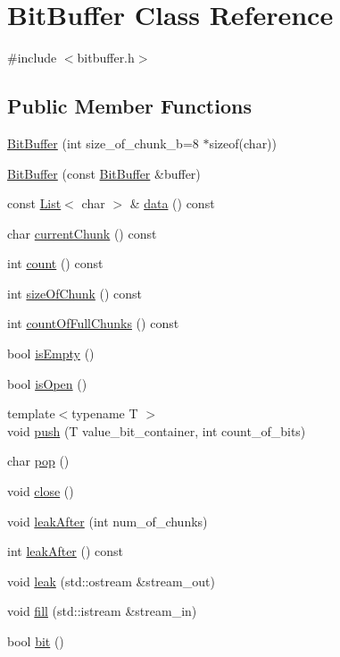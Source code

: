 \hypertarget{class_bit_buffer}{}\section{Bit\+Buffer Class Reference}
\label{class_bit_buffer}


{\ttfamily \#include $<$bitbuffer.\+h$>$}

\subsection*{Public Member Functions}
\begin{DoxyCompactItemize}
\item 
\hyperlink{class_bit_buffer_a01ccbe0835f8aaa203720d6c4f99b68e}{Bit\+Buffer} (int size\+\_\+of\+\_\+chunk\+\_\+b=8 $\ast$sizeof(char))
\item 
\hyperlink{class_bit_buffer_af78925f3b1d992d934545616c1d00dd2}{Bit\+Buffer} (const \hyperlink{class_bit_buffer}{Bit\+Buffer} \&buffer)
\item 
const \hyperlink{class_list}{List}$<$ char $>$ \& \hyperlink{class_bit_buffer_ad56372e6eb410a195913a0cae28d7006}{data} () const
\item 
char \hyperlink{class_bit_buffer_a3f5383b7d9b27478f614cd8762a266a5}{current\+Chunk} () const
\item 
int \hyperlink{class_bit_buffer_a8c13b651d37586ec5c2d30f45ed89e53}{count} () const
\item 
int \hyperlink{class_bit_buffer_adf758958884467e15cd018190178bf3d}{size\+Of\+Chunk} () const
\item 
int \hyperlink{class_bit_buffer_ad473b6b2aedbb96198d57d5762c5c108}{count\+Of\+Full\+Chunks} () const
\item 
bool \hyperlink{class_bit_buffer_aaec114c48d1b1be84a8178b6b956f3d0}{is\+Empty} ()
\item 
bool \hyperlink{class_bit_buffer_ae70825daafd0a00625fbb6dfb9b83fba}{is\+Open} ()
\item 
{\footnotesize template$<$typename T $>$ }\\void \hyperlink{class_bit_buffer_a1998d0bdd95e025f39e81671f5a20106}{push} (T value\+\_\+bit\+\_\+container, int count\+\_\+of\+\_\+bits)
\item 
char \hyperlink{class_bit_buffer_a8f569dfa9535ac107c84846f22a45221}{pop} ()
\item 
void \hyperlink{class_bit_buffer_a1075aee0daeee83dbe4908c325b6969f}{close} ()
\item 
void \hyperlink{class_bit_buffer_a10df48560dfbdd304a4e05a610379dc8}{leak\+After} (int num\+\_\+of\+\_\+chunks)
\item 
int \hyperlink{class_bit_buffer_a28c31e06cd23a8ab3f7276bbb2c64b39}{leak\+After} () const
\item 
void \hyperlink{class_bit_buffer_a56d1e27a00a27e1ac95f2e03255081eb}{leak} (std\+::ostream \&stream\+\_\+out)
\item 
void \hyperlink{class_bit_buffer_a91b2bfeb34d3e2d01fd23f417928f261}{fill} (std\+::istream \&stream\+\_\+in)
\item 
bool \hyperlink{class_bit_buffer_a50d13861a778aff828e42e4f32371726}{bit} ()
\end{DoxyCompactItemize}


